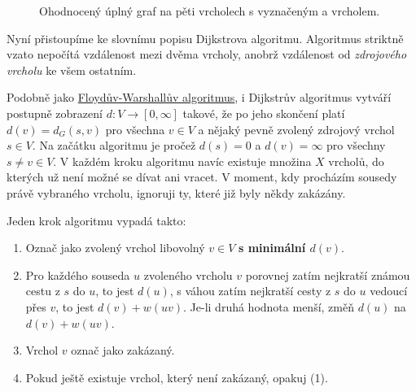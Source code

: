 \begin{figure}[h]
 \centering

 \caption{Ohodnocený úplný graf na pěti vrcholech s vyznačeným  a
  vrcholem.}
 \label{fig:uplny-graf}
\end{figure}

Nyní přistoupíme ke slovnímu popisu Dijkstrova algoritmu. Algoritmus striktně
vzato nepočítá vzdálenost mezi dvěma vrcholy, anobrž vzdálenost od
\emph{zdrojového vrcholu} ke všem ostatním.

Podobně jako \hyperref[alg:floyd-warshall]{Floydův-Warshallův algoritmus}, i
Dijkstrův algoritmus vytváří postupně zobrazení $d:V \to [0,\infty]$ takové, že
po jeho skončení platí $d(v) = d_G(s,v)$ pro všechna $v \in V$ a nějaký pevně
zvolený zdrojový vrchol $s \in V$. Na začátku algoritmu je pročež $d(s) = 0$ a
$d(v) = \infty$ pro všechny $s \neq v \in V$. V každém kroku algoritmu navíc
existuje množina $X$  vrcholů, do kterých už není možné se dívat
ani vracet. V moment, kdy procházím sousedy právě vybraného vrcholu, ignoruji
ty, které již byly někdy zakázány.

Jeden krok algoritmu vypadá takto:
\begin{enumerate}
 \item Označ jako zvolený vrchol libovolný $v \in V$ \textbf{s minimální
  $d(v)$}.
 \item Pro každého souseda $u$ zvoleného vrcholu $v$ porovnej zatím nejkratší
  známou cestu z $s$ do $u$, to jest $d(u)$, s váhou zatím nejkratší cesty z $s$
  do $u$ vedoucí přes $v$, to jest $d(v) + w(uv)$. Je-li druhá hodnota menší,
  změň $d(u)$ na $d(v) + w(uv)$.
 \item Vrchol $v$ označ jako zakázaný.
 \item Pokud ještě existuje vrchol, který není zakázaný, opakuj (1).
\end{enumerate}

